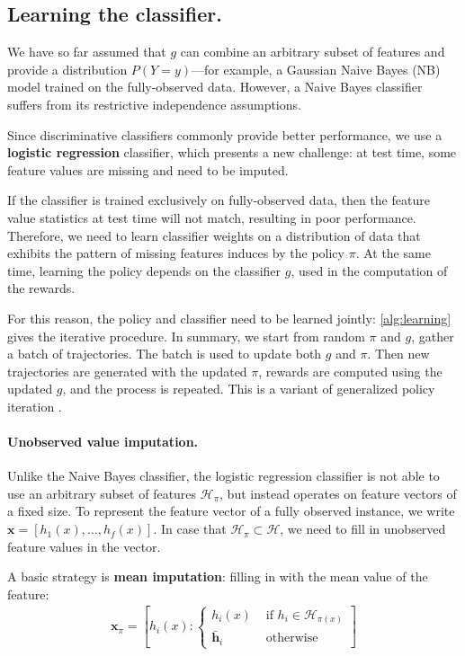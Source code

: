 \subsection{Learning the classifier.}\label{sec:classifier}

We have so far assumed that $g$ can combine an arbitrary subset of features and provide a distribution $P(Y = y)$---for example, a Gaussian Naive Bayes (NB) model trained on the fully-observed data.
However, a Naive Bayes classifier suffers from its restrictive independence assumptions.

Since discriminative classifiers commonly provide better performance, we use a \textbf{logistic regression} classifier, which presents a new challenge: at test time, some feature values are missing and need to be imputed.

If the classifier is trained exclusively on fully-observed data, then the feature value statistics at test time will not match, resulting in poor performance.
Therefore, we need to learn classifier weights on a distribution of data that exhibits the pattern of missing features induces by the policy $\pi$.
At the same time, learning the policy depends on the classifier $g$, used in the computation of the rewards.

For this reason, the policy and classifier need to be learned jointly: \autoref{alg:learning} gives the iterative procedure.
In summary, we start from random $\pi$ and $g$, gather a batch of trajectories.
The batch is used to update both $g$ and $\pi$.
Then new trajectories are generated with the updated $\pi$, rewards are computed using the updated $g$, and the process is repeated.
This is a variant of generalized policy iteration \cite{Sutton1998}.

\paragraph{Unobserved value imputation.}
Unlike the Naive Bayes classifier, the logistic regression classifier is not able to use an arbitrary subset of features $\mathcal{H}_\pi$, but instead operates on feature vectors of a fixed size.
To represent the feature vector of a fully observed instance, we write $\mathbf{x} = [h_1(x), \dots, h_f(x)]$.
In case that $\mathcal{H}_\pi \subset \mathcal{H}$, we need to fill in unobserved feature values in the vector.

A basic strategy is \textbf{mean imputation}: filling in with the mean value of the feature:
\begin{align}
\mathbf{x}_\pi = \left[ h_i(x) : \left\{ \begin{array}{rl}
 h_i(x) &\mbox{ if $h_i \in \mathcal{H}_{\pi(x)}$} \\
 \bar{\mathbf{h}}_i &\mbox{ otherwise}
\end{array} \right. \right]
\end{align}

